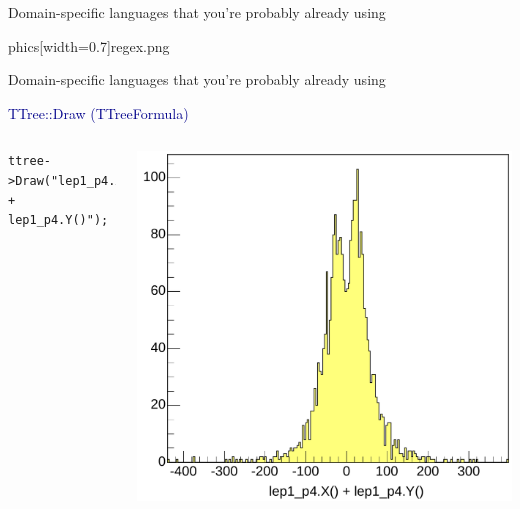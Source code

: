\documentclass[aspectratio=169]{beamer}
\begin{document}
\begin{frame}{Domain-specific languages that you're probably already using}
\begin{center}
phics[width=0.7\linewidth]{regex.png}
\end{center}
\end{frame}

\begin{frame}[fragile]{Domain-specific languages that you're probably already using}
\LARGE
\vspace{0.5 cm}

\textcolor{darkblue}{TTree::Draw (TTreeFormula)}

\vspace{-1 cm}
\normalsize
\begin{columns}
\begin{verbatim}
ttree->Draw("lep1_p4.X() + lep1_p4.Y()");
\end{verbatim}

\includegraphics[width=\linewidth]{ttree-draw.pdf}
\end{columns}


\end{frame}
\end{document}
